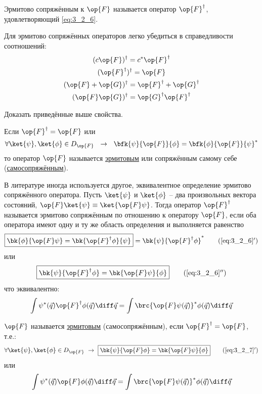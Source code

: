 \begin{defn}
Эрмитово сопряжённым к $\op{F}$ называется оператор $\op{F}^\dag$, удовлетворяющий \eqref{eq:3_2_6}.
\end{defn}

Для эрмитово сопряжённых операторов легко убедиться в справедливости соотношений:
$$
\begin{gathered}
(c\op{F})^\dag = c^* \op{F}^\dag \\
(\op{F}^\dag)^\dag = \op{F} \\
(\op{F} + \op{G})^\dag = \op{F}^\dag + \op{G}^\dag \\
(\op{F}\op{G})^\dag = \op{G}^\dag \op{F}^\dag
\end{gathered}
$$

\begin{excr}
Доказать приведённые выше свойства.
\end{excr}

\begin{defn}
Если $\op{F}^\dag = \op{F}$ или
\begin{equation}
\label{eq:3_2_7}
\forall \ket{\psi},\ket{\phi} \in D_{\op{F}} ~~\to~~
	\bfk{\psi}{\op{F}}{\phi} = \bfk{\phi}{\op{F}}{\psi}^*
\end{equation}
то оператор $\op{F}$ называется \underline{эрмитовым} или сопряжённым самому себе (\underline{самосопряжённым}).
\end{defn}

В литературе иногда используется другое, эквивалентное определение эрмитово сопряжённого оператора. Пусть $\ket{\psi}$ и $\ket{\phi}$ -- два произвольных вектора состояний, $\op{F}\ket{\psi} \equiv \ket{\op{F}\psi}$. Тогда оператор $\op{F}^\dag$ называется эрмитово сопряжённым по отношению к оператору $\op{F}$, если оба оператора имеют одну и ту же область определения и выполняется равенство
\begin{equation}
\label{eq:3_2_6_add}
\boxed{
	\bk{\phi}{\op{F}\psi} = \bk{\op{F}^\dag\phi}{\psi}
} = \bk{\psi}{\op{F}^\dag \phi}^*
\tag{\ref{eq:3_2_6}$'$}
\end{equation}
или
\begin{equation}
\label{eq:3_2_6_add_x2}
\boxed{
	\bk{\psi}{\op{F}^\dag \phi} = \bk{\op{F} \psi}{\phi}
}
\tag{\ref{eq:3_2_6}$''$}
\end{equation}
что эквивалентно:
$$
\int \psi^*(\vec{q}) \op{F}^\dag \phi(\vec{q})\diff\vec{q}
  = \int \brc{\op{F} \psi(\vec{q})}^* \phi(\vec{q})\diff\vec{q}
$$

\begin{defn}
$\op{F}$ называется \underline{эрмитовым} (самосопряжённым), если $\op{F}^\dag = \op{F}$, т.е.:
\begin{equation}
\label{eq:3_2_7_add}
\forall \ket{\psi}, \ket{\phi} \in D_{\op{F}}  ~\to~ \boxed{ \bk{\psi}{\op{F} \phi} = \bk{\op{F}\psi}{\phi} }
\tag{\ref{eq:3_2_7}$'$}
\end{equation}
или
$$
\int \psi^*(\vec{q}) \op{F} \phi(\vec{q})\diff\vec{q}
  = \int \brc{\op{F} \psi(\vec{q})}^* \phi(\vec{q})\diff\vec{q}
$$
\end{defn}

